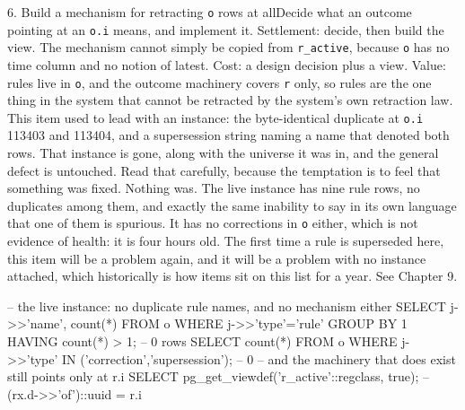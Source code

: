 \begin{Open}{6. Build a mechanism for retracting \texttt{o} rows at all}{Decide what an outcome pointing at an \texttt{o.i} means, and implement it.}
Settlement: decide, then build the view. The mechanism cannot simply be copied from \texttt{r\_active}, because \texttt{o} has no time column and no notion of latest. Cost: a design decision plus a view. Value: rules live in \texttt{o}, and the outcome machinery covers \texttt{r} only, so rules are the one thing in the system that cannot be retracted by the system's own retraction law. This item used to lead with an instance: the byte-identical duplicate  at \texttt{o.i} 113403 and 113404, and a supersession string naming a name that denoted both rows. That instance is gone, along with the universe it was in, and the general defect is untouched. Read that carefully, because the temptation is to feel that something was fixed. Nothing was. The live instance has nine rule rows, no duplicates among them, and exactly the same inability to say in its own language that one of them is spurious. It has no corrections in \texttt{o} either, which is not evidence of health: it is four hours old. The first time a rule is superseded here, this item will be a problem again, and it will be a problem with no instance attached, which historically is how items sit on this list for a year. See Chapter 9.
\begin{Check}
-- the live instance: no duplicate rule names, and no mechanism either
SELECT j->>'name', count(*) FROM o WHERE j->>'type'='rule' GROUP BY 1 HAVING count(*) > 1;
  -- 0 rows
SELECT count(*) FROM o WHERE j->>'type' IN ('correction','supersession');
  -- 0
-- and the machinery that does exist still points only at r.i
SELECT pg_get_viewdef('r_active'::regclass, true);   -- (rx.d->>'of')::uuid = r.i
\end{Check}
\end{Open}

